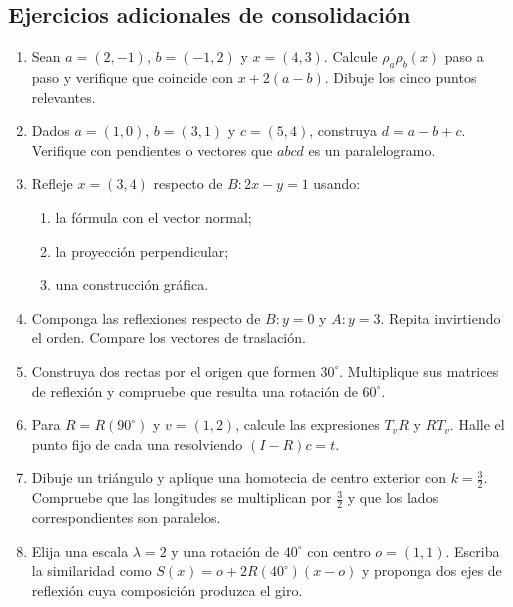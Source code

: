 \subsection{Ejercicios adicionales de consolidación}

\begin{enumerate}
  \item Sean \(a=(2,-1)\), \(b=(-1,2)\) y \(x=(4,3)\). Calcule
  \(\rho_a\rho_b(x)\) paso a paso y verifique que coincide con
  \(x+2(a-b)\). Dibuje los cinco puntos relevantes.

  \item Dados \(a=(1,0)\), \(b=(3,1)\) y \(c=(5,4)\), construya
  \(d=a-b+c\). Verifique con pendientes o vectores que \(abcd\) es un
  paralelogramo.

  \item Refleje \(x=(3,4)\) respecto de \(B:2x-y=1\) usando:
  \begin{enumerate}[label=\alph*)]
    \item la fórmula con el vector normal;
    \item la proyección perpendicular;
    \item una construcción gráfica.
  \end{enumerate}

  \item Componga las reflexiones respecto de \(B:y=0\) y \(A:y=3\).
  Repita invirtiendo el orden. Compare los vectores de traslación.

  \item Construya dos rectas por el origen que formen \(30^\circ\).
  Multiplique sus matrices de reflexión y compruebe que resulta una rotación
  de \(60^\circ\).

  \item Para \(R=R(90^\circ)\) y \(v=(1,2)\), calcule las expresiones
  \(T_vR\) y \(RT_v\). Halle el punto fijo de cada una resolviendo
  \((I-R)c=t\).

  \item Dibuje un triángulo y aplique una homotecia de centro exterior con
  \(k=\frac32\). Compruebe que las longitudes se multiplican por
  \(\frac32\) y que los lados correspondientes son paralelos.

  \item Elija una escala \(\lambda=2\) y una rotación de \(40^\circ\) con
  centro \(o=(1,1)\). Escriba la similaridad como
  \(S(x)=o+2R(40^\circ)(x-o)\) y proponga dos ejes de reflexión cuya
  composición produzca el giro.
\end{enumerate}

